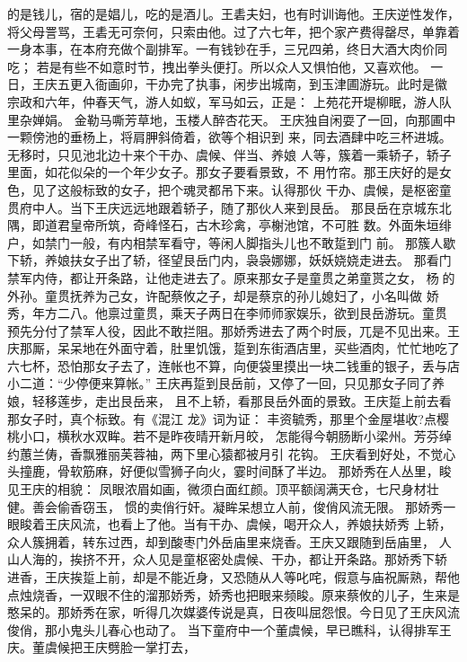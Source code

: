 的是钱儿，宿的是娼儿，吃的是酒儿。王砉夫妇，也有时训诲他。王庆逆性发作，
将父母詈骂，王砉无可奈何，只索由他。过了六七年，把个家产费得罄尽，单靠着
一身本事，在本府充做个副排军。一有钱钞在手，三兄四弟，终日大酒大肉价同吃；
若是有些不如意时节，拽出拳头便打。所以众人又惧怕他，又喜欢他。
一日，王庆五更入衙画卯，干办完了执事，闲步出城南，到玉津圃游玩。此时是徽
宗政和六年，仲春天气，游人如蚁，军马如云，正是：
上苑花开堤柳眠，游人队里杂婵娟。
金勒马嘶芳草地，玉楼人醉杏花天。
王庆独自闲耍了一回，向那圃中一颗傍池的垂杨上，将肩胛斜倚着，欲等个相识到
来，同去酒肆中吃三杯进城。无移时，只见池北边十来个干办、虞候、伴当、养娘
人等，簇着一乘轿子，轿子里面，如花似朵的一个年少女子。那女子要看景致，不
用竹帘。那王庆好的是女色，见了这般标致的女子，把个魂灵都吊下来。认得那伙
干办、虞候，是枢密童贯府中人。当下王庆远远地跟着轿子，随了那伙人来到艮岳。
那艮岳在京城东北隅，即道君皇帝所筑，奇峰怪石，古木珍禽，亭榭池馆，不可胜
数。外面朱垣绯户，如禁门一般，有内相禁军看守，等闲人脚指头儿也不敢踅到门
前。
那簇人歇下轿，养娘扶女子出了轿，径望艮岳门内，袅袅娜娜，妖妖娆娆走进去。
那看门禁军内侍，都让开条路，让他走进去了。原来那女子是童贯之弟童贳之女，
杨的外孙。童贯抚养为己女，许配蔡攸之子，却是蔡京的孙儿媳妇了，小名叫做
娇秀，年方二八。他禀过童贯，乘天子两日在李师师家娱乐，欲到艮岳游玩。童贯
预先分付了禁军人役，因此不敢拦阻。那娇秀进去了两个时辰，兀是不见出来。王
庆那厮，呆呆地在外面守着，肚里饥饿，踅到东街酒店里，买些酒肉，忙忙地吃了
六七杯，恐怕那女子去了，连帐也不算，向便袋里摸出一块二钱重的银子，丢与店
小二道：“少停便来算帐。”
王庆再踅到艮岳前，又停了一回，只见那女子同了养娘，轻移莲步，走出艮岳来，
且不上轿，看那艮岳外面的景致。王庆踅上前去看那女子时，真个标致。有《混江
龙》词为证：
丰资毓秀，那里个金屋堪收?点樱桃小口，横秋水双眸。若不是昨夜晴开新月皎，
怎能得今朝肠断小梁州。芳芬绰约蕙兰俦，香飘雅丽芙蓉袖，两下里心猿都被月引
花钩。
王庆看到好处，不觉心头撞鹿，骨软筋麻，好便似雪狮子向火，霎时间酥了半边。
那娇秀在人丛里，睃见王庆的相貌：
凤眼浓眉如画，微须白面红颜。顶平额阔满天仓，七尺身材壮健。善会偷香窃玉，
惯的卖俏行奸。凝眸呆想立人前，俊俏风流无限。
那娇秀一眼睃着王庆风流，也看上了他。当有干办、虞候，喝开众人，养娘扶娇秀
上轿，众人簇拥着，转东过西，却到酸枣门外岳庙里来烧香。王庆又跟随到岳庙里，
人山人海的，挨挤不开，众人见是童枢密处虞候、干办，都让开条路。那娇秀下轿
进香，王庆挨踅上前，却是不能近身，又恐随从人等叱咤，假意与庙祝厮熟，帮他
点烛烧香，一双眼不住的溜那娇秀，娇秀也把眼来频睃。原来蔡攸的儿子，生来是
憨呆的。那娇秀在家，听得几次媒婆传说是真，日夜叫屈怨恨。今日见了王庆风流
俊俏，那小鬼头儿春心也动了。
当下童府中一个董虞候，早已瞧科，认得排军王庆。董虞候把王庆劈脸一掌打去，

